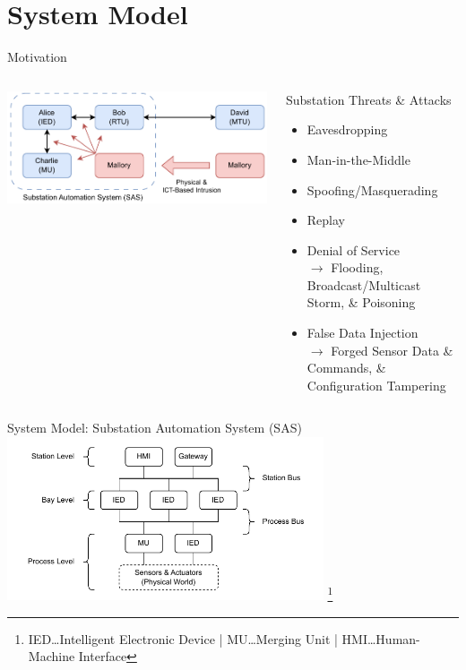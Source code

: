 \documentclass[en]{sdqbeamer}
\newcommand\nonumberfootnote[1]{%
  \begingroup
  \renewcommand\thefootnote{}\footnote{#1}%
  \addtocounter{footnote}{-1}%
  \endgroup
}
\begin{document}
\section{System Model}
\begin{frame}{Motivation}
    \begin{columns}
        \centering
        \includegraphics[width=1.0\textwidth]{./figures/sas_intrusion.drawio.pdf}
        \begin{redblock}{Substation Threats \& Attacks}
            \begin{itemize}
                \item Eavesdropping
                \item Man-in-the-Middle
                \item Spoofing/Masquerading
                \item Replay
                \item Denial of Service\\$\rightarrow$ Flooding, Broadcast/Multicast Storm, \& Poisoning
                \item False Data Injection\\$\rightarrow$ Forged Sensor Data \& Commands, \& Configuration Tampering
            \end{itemize}
        \end{redblock}
    \end{columns}
\end{frame}
\begin{frame}{System Model: Substation Automation System (SAS)}
    \centering
    \includegraphics[width=0.7\textwidth]{./figures/substation_architecture.drawio.pdf}
    \nonumberfootnote{IED\dots Intelligent Electronic Device | MU\dots Merging Unit | HMI\dots Human-Machine Interface}
\end{frame}
\end{document}
